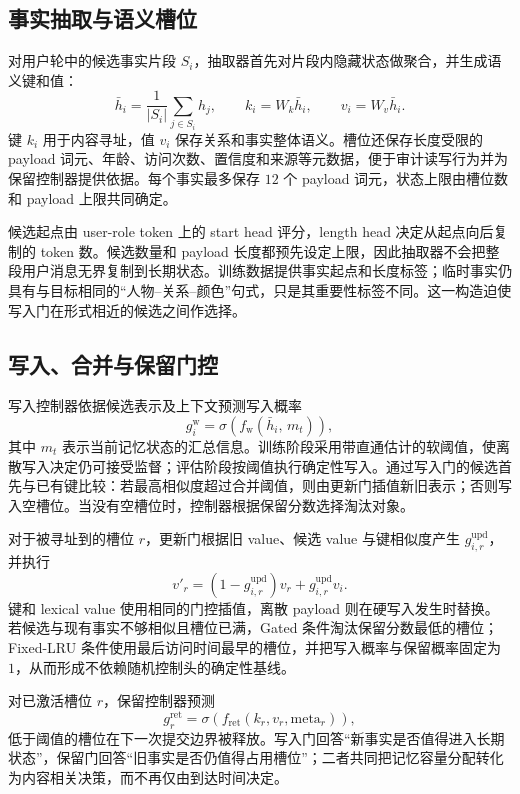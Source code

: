 \documentclass[letterpaper]{article}
\begin{document}
\subsection{事实抽取与语义槽位}

对用户轮中的候选事实片段 $S_i$，抽取器首先对片段内隐藏状态做聚合，并生成语义键和值：
\begin{equation}
\bar{h}_i=\frac{1}{|S_i|}\sum_{j\in S_i}h_j,\qquad
k_i=W_k\bar{h}_i,\qquad v_i=W_v\bar{h}_i.
\end{equation}
键 $k_i$ 用于内容寻址，值 $v_i$ 保存关系和事实整体语义。槽位还保存长度受限的 payload 词元、年龄、访问次数、置信度和来源等元数据，便于审计读写行为并为保留控制器提供依据。每个事实最多保存 $12$ 个 payload 词元，状态上限由槽位数和 payload 上限共同确定。

候选起点由 user-role token 上的 start head 评分，length head 决定从起点向后复制的 token 数。候选数量和 payload 长度都预先设定上限，因此抽取器不会把整段用户消息无界复制到长期状态。训练数据提供事实起点和长度标签；临时事实仍具有与目标相同的“人物--关系--颜色”句式，只是其重要性标签不同。这一构造迫使写入门在形式相近的候选之间作选择。

\subsection{写入、合并与保留门控}

写入控制器依据候选表示及上下文预测写入概率
\begin{equation}
g_i^{\mathrm{w}}=\sigma\!\left(f_{\mathrm{w}}(\bar h_i,\,m_t)\right),
\end{equation}
其中 $m_t$ 表示当前记忆状态的汇总信息。训练阶段采用带直通估计的软阈值，使离散写入决定仍可接受监督；评估阶段按阈值执行确定性写入。通过写入门的候选首先与已有键比较：若最高相似度超过合并阈值，则由更新门插值新旧表示；否则写入空槽位。当没有空槽位时，控制器根据保留分数选择淘汰对象。

对于被寻址到的槽位 $r$，更新门根据旧 value、候选 value 与键相似度产生 $g^{\mathrm{upd}}_{i,r}$，并执行
\begin{equation}
v'_r=(1-g^{\mathrm{upd}}_{i,r})v_r+
g^{\mathrm{upd}}_{i,r}v_i.
\end{equation}
键和 lexical value 使用相同的门控插值，离散 payload 则在硬写入发生时替换。若候选与现有事实不够相似且槽位已满，Gated 条件淘汰保留分数最低的槽位；Fixed-LRU 条件使用最后访问时间最早的槽位，并把写入概率与保留概率固定为 $1$，从而形成不依赖随机控制头的确定性基线。

对已激活槽位 $r$，保留控制器预测
\begin{equation}
g_r^{\mathrm{ret}}=\sigma\!\left(f_{\mathrm{ret}}
(k_r,v_r,\mathrm{meta}_r)\right),
\end{equation}
低于阈值的槽位在下一次提交边界被释放。写入门回答“新事实是否值得进入长期状态”，保留门回答“旧事实是否仍值得占用槽位”；二者共同把记忆容量分配转化为内容相关决策，而不再仅由到达时间决定。
\end{document}
